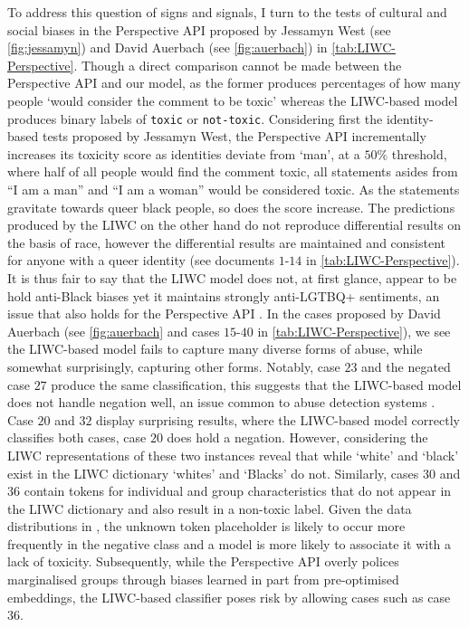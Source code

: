 To address this question of signs and signals, I turn to the tests of cultural and social biases in the Perspective API proposed by Jessamyn West (see \autoref{fig:jessamyn}) and David Auerbach (see \autoref{fig:auerbach}) in \autoref{tab:LIWC-Perspective}.
Though a direct comparison cannot be made between the Perspective API and our model, as the former produces percentages of how many people `would consider the comment to be toxic' \citep{Perspective:Github} whereas the LIWC-based model produces binary labels of \texttt{toxic} or \texttt{not-toxic}.
Considering first the identity-based tests proposed by Jessamyn West, the Perspective API incrementally increases its toxicity score as identities deviate from `man', at a $50\%$ threshold, where half of all people would find the comment toxic, all statements asides from ``I am a man'' and ``I am a woman'' would be considered toxic.
As the statements gravitate towards queer black people, so does the score increase.
The predictions produced by the LIWC on the other hand do not reproduce differential results on the basis of race, however the differential results are maintained and consistent for anyone with a queer identity (see documents $1$-$14$ in \autoref{tab:LIWC-Perspective}).
It is thus fair to say that the LIWC model does not, at first glance, appear to be hold anti-Black biases yet it maintains strongly anti-LGTBQ+ sentiments, an issue that also holds for the Perspective API \citep{Dias:2021}.
In the cases proposed by David Auerbach (see \autoref{fig:auerbach} and cases $15$-$40$ in \autoref{tab:LIWC-Perspective}), we see  the LIWC-based model fails to capture many diverse forms of abuse, while somewhat surprisingly, capturing other forms.
Notably, case $23$ and the negated case $27$ produce the same classification, this suggests that the LIWC-based model does not handle negation well, an issue common to abuse detection systems \cite{Rottger:2021}.
Case $20$ and $32$  display surprising results, where the LIWC-based model correctly classifies both cases,  case $20$ does hold a negation.
However, considering the LIWC representations of these two instances reveal that while `white' and `black' exist in the LIWC dictionary `whites' and `Blacks' do not.
Similarly, cases $30$ and $36$ contain tokens for individual and group characteristics that do not appear in the LIWC dictionary and also result in a non-toxic label.
Given the data distributions in \citet{Wulczyn:2017}, the unknown token placeholder is likely to occur more frequently in the negative class and a model is more likely to associate it with a lack of toxicity.
Subsequently, while the Perspective API overly polices marginalised groups through biases learned in part from pre-optimised embeddings, the LIWC-based classifier poses risk by allowing cases such as case $36$.

